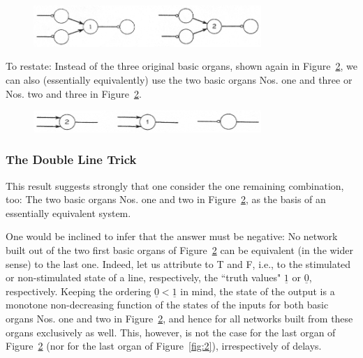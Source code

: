 \documentclass[twocolumn,preprintnumbers,amsmath,amssymb,floatfix]{revtex4}
\begin{document}
\begin{figure}[t]
\includegraphics[width=3.4in]{fig_9}
\caption{\label{fig:9}}
\end{figure}

To restate: Instead of the three original basic organs, shown
again in Figure~\ref{fig:10}, we can also (essentially
equivalently) use the two basic organs Nos. one and three or Nos.
two and three in Figure~\ref{fig:10}.

\begin{figure}[b]
\includegraphics[width=3.4in]{fig_10}
\caption{\label{fig:10}}
\end{figure}

\subsubsection{\label{sec:four1_2}The Double Line Trick} This result suggests strongly
that one consider the one remaining combination, too: The two
basic organs Nos. one and two in Figure~\ref{fig:10}, as the basis
of an essentially equivalent system.

One would be inclined to infer that the answer must be negative:
No network built out of the two first basic organs of
Figure~\ref{fig:10} can be equivalent (in the wider sense) to the
last one. Indeed, let us attribute to T and F, i.e., to the
stimulated or non-stimulated state of a line, respectively, the
``truth values" $\underline{1}$ or $\underline{0}$, respectively.
Keeping the ordering $\underline{0}<\underline{1}$ in mind, the
state of the output is a monotone non-decreasing function of the
states of the inputs for both basic organs Nos. one and two in
Figure~\ref{fig:10}, and hence for all networks built from these
organs exclusively as well. This, however, is not the case for the
last organ of Figure~\ref{fig:10} (nor for the last organ of
Figure~\ref{fig:2}), irrespectively of delays.
\end{document}
